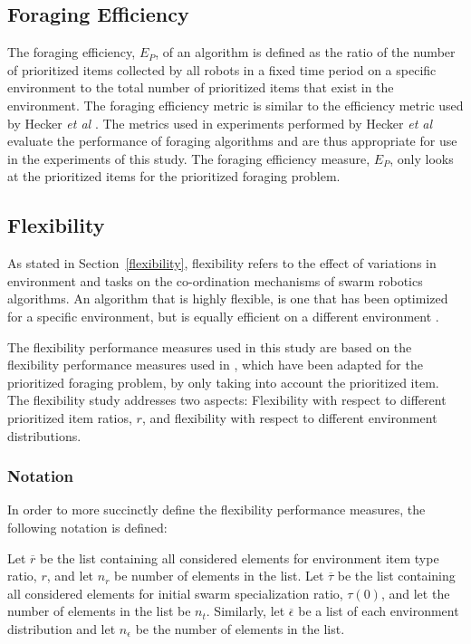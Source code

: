 \subsection{Foraging Efficiency}
\label{setup:foragingefficiency}
The foraging efficiency, $E_P$, of an algorithm is defined as the ratio of the number of prioritized items collected by all robots in a fixed time period on a specific environment to the total number of prioritized items that exist in the environment. The foraging efficiency metric is similar to the efficiency metric used by Hecker \textit{et al} \cite{hecker2015beyond}. The metrics used in experiments performed by Hecker \textit{et al} evaluate the performance of foraging algorithms and are thus appropriate for use in the experiments of this study. The foraging efficiency measure, $E_P$, only looks at the prioritized items for the prioritized foraging problem.


\subsection{Flexibility}
\label{setup:flexibility}

As stated in Section~\ref{flexibility}, flexibility refers to the effect of variations in environment and tasks on the co-ordination mechanisms of swarm robotics algorithms. An algorithm that is highly flexible, is one that has been optimized for a specific environment, but is equally efficient on a different environment \cite{hecker2015beyond}.

The flexibility performance measures used in this study are based on the flexibility performance measures used in \cite{hecker2015beyond}, which have been adapted for the prioritized foraging problem, by only taking into account the prioritized item. The flexibility study addresses two aspects: Flexibility with respect to different prioritized item ratios, $r$, and flexibility with respect to different environment distributions.

\subsubsection{Notation}

In order to more succinctly define the flexibility performance measures, the following notation is defined:

Let $\overline{r}$ be the list containing all considered elements for environment item type ratio, $r$, and let $n_r$ be number of elements in the list. Let $\overline{\tau}$ be the list containing all considered elements for initial swarm specialization ratio, $\tau(0)$, and let the number of elements in the list be $n_t$. Similarly, let $\overline{\epsilon}$ be a list of each environment distribution and let $n_\epsilon$ be the number of elements in the list.

